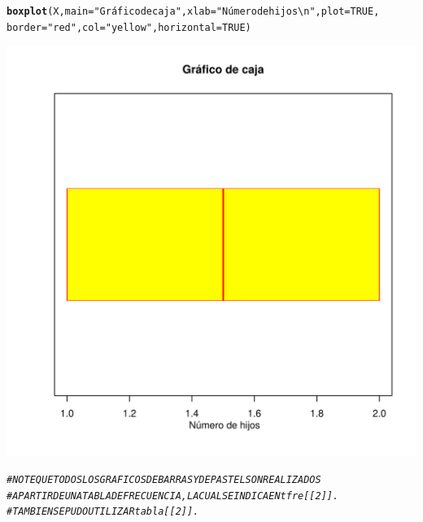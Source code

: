 \documentclass[12pt,letterpaper]{article}\usepackage[]{graphicx}\usepackage[]{color}
\makeatletter
\def\maxwidth{ %
  \ifdim\Gin@nat@width>\linewidth
    \linewidth
  \else
    \Gin@nat@width
  \fi
}
\newcommand{\hlnum}[1]{\textcolor[rgb]{0.686,0.059,0.569}{#1}}%
\newcommand{\hlstr}[1]{\textcolor[rgb]{0.192,0.494,0.8}{#1}}%
\newcommand{\hlcom}[1]{\textcolor[rgb]{0.678,0.584,0.686}{\textit{#1}}}%
\newcommand{\hlstd}[1]{\textcolor[rgb]{0.345,0.345,0.345}{#1}}%
\newcommand{\hlkwc}[1]{\textcolor[rgb]{0.333,0.667,0.333}{#1}}%
\newcommand{\hlkwd}[1]{\textcolor[rgb]{0.737,0.353,0.396}{\textbf{#1}}}%
\newenvironment{kframe}{%
 \def\at@end@of@kframe{}%
 \ifinner\ifhmode%
  \def\at@end@of@kframe{\end{minipage}}%
  \begin{minipage}{\columnwidth}%
 \fi\fi%
 \def\FrameCommand##1{\hskip\@totalleftmargin \hskip-\fboxsep
 \colorbox{shadecolor}{##1}\hskip-\fboxsep
     \hskip-\linewidth \hskip-\@totalleftmargin \hskip\columnwidth}%
 \MakeFramed {\advance\hsize-\width
   \@totalleftmargin\z@ \linewidth\hsize
   \@setminipage}}%
 {\par\unskip\endMakeFramed%
 \at@end@of@kframe}
\newenvironment{knitrout}{}{} %
\makeatother
\begin{document}
\begin{enumerate}
\begin{knitrout}
\begin{kframe}
\begin{alltt}
\hlkwd{boxplot}\hlstd{(X,} \hlkwc{main}\hlstd{=}\hlstr{"Gráfico de caja"}\hlstd{,} \hlkwc{xlab}\hlstd{=}\hlstr{" Número de hijos\textbackslash{}n"}\hlstd{,} \hlkwc{plot}\hlstd{=}\hlnum{TRUE}\hlstd{,}
        \hlkwc{border}\hlstd{=}\hlstr{"red"}\hlstd{,} \hlkwc{col}\hlstd{=}\hlstr{"yellow"}\hlstd{,} \hlkwc{horizontal}\hlstd{=}\hlnum{TRUE}\hlstd{)}
\end{alltt}
\end{kframe}
\includegraphics[width=\maxwidth]{figure/unnamed-chunk-28-1} 

\end{knitrout}

\begin{knitrout}
\color{fgcolor}\begin{kframe}
\begin{alltt}
\hlcom{# NOTE QUE TODOS LOS GRAFICOS DE BARRAS Y DE PASTEL SON REALIZADOS }
\hlcom{# APARTIR DE UNA TABLA DE FRECUENCIA, LA CUAL SE INDICA EN tfre[[2]]. }
\hlcom{# TAMBIEN SE PUDO UTILIZAR tabla[[2]]. }
\end{alltt}
\end{kframe}
\end{knitrout}
























\end{enumerate}
\end{document}
